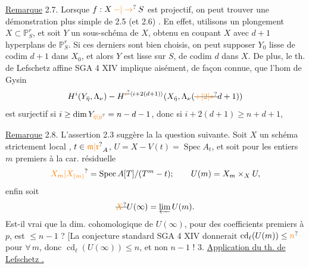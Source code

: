 \uline{Remarque} 2.7. Lorsque $f:X\mathbin{\unsure{-|\to}}S$ est projectif, on peut trouver une démonstration plus simple de  2.5 (et  2.6) . En effet,  utilisons un plongement $X\subset\mathbb P^r_S$, et soit $Y$ un sous-schéma de $X$, obtenu en coupant $X$ avec $d+1$  hyperplans de $\mathbb P^r_S$.
Si ces derniers sont bien choisis, on peut supposer $Y_0$ lisse de codim $d+1$ dans $X_0$, et alors $Y$ est lisse sur $S$, de codim $d$ dans $X$. De plus, le th. de Lefschetz affine SGA 4 XIV implique aisément,  de façon connue, que l'hom de Gysin
\[
H^i(Y_{\bar\eta},\Lambda_\nu)\mathbin{-}H^{\deleted{\unsure{i}}\inserted{i+2(d+1)}}(X_{\bar\eta},\Lambda_\nu(\deleted{\unsure{+|2|*}}d+1))
\]
est surjectif si $i\geq\dim Y_{\unsure{\bar\eta|\bar y}}=n-d-1$,  donc si $i+2(d+1)\geq n+d+1$, 

\uline{Remarque} 2.8. L'assertion 2.3 suggère la  la question suivante. Soit $X$  un schéma strictement local , $t\in\unsure{\mathfrak m|\mathfrak r}_A$,  $U=X-V(t)=\operatorname{Spec}A_t$, et soit pour les entiers $m$ premiers à la car. résiduelle
\[
\unsure{X_m|X_{(m)}}=\operatorname{Spec}A[T]/(T^m-t);\qquad U(m)=X_m\times_X U,
\]
enfin soit
\[
\deleted{\unsure{X}}U(\infty)=\varprojlim U(m).
\]
Est-il vrai que la dim. cohomologique de $U(\infty)$, pour des coefficients premiers à  $p$, est $\leq n-1$ ? [La conjecture standard SGA 4 XIV   donnerait  $\operatorname{cd}_\ell(U(m))\leq\unsure{n}$ pour $\forall\,m$, donc $\operatorname{cd}_\ell(U(\infty))\leq n$, et non $n-1$ !
3. \uline{Application du th. de Lefschetz   .}

